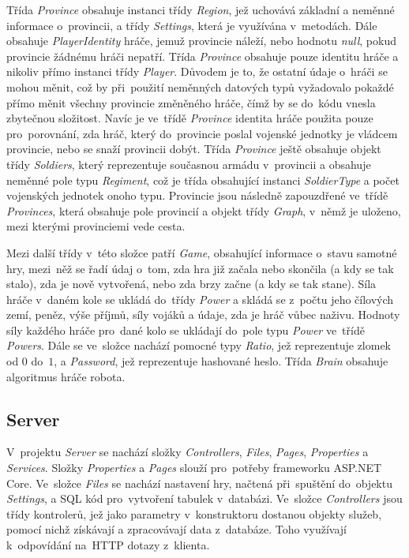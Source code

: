 \documentclass[a4paper,12pt]{article}
\begin{document}
Třída \textit{Province} obsahuje instanci třídy \textit{Region}, jež uchovává základní a neměnné informace o~provincii, a třídy \textit{Settings}, která je využívána v~metodách. Dále obsahuje \textit{PlayerIdentity} hráče, jemuž provincie náleží, nebo hodnotu \textit{null}, pokud provincie žádnému hráči nepatří. Třída \textit{Province} obsahuje pouze identitu hráče a nikoliv přímo instanci třídy \textit{Player}. Důvodem je to, že ostatní údaje o~hráči se mohou měnit, což by při~použití neměnných datových typů vyžadovalo pokaždé přímo měnit všechny provincie změněného hráče, čímž by se do~kódu vnesla zbytečnou složitost. Navíc je ve~třídě \textit{Province} identita hráče použita pouze pro~porovnání, zda hráč, který do~provincie poslal vojenské jednotky je vládcem provincie, nebo se snaží provincii dobýt. Třída \textit{Province} ještě obsahuje objekt třídy \textit{Soldiers}, který reprezentuje současnou armádu v~provincii a obsahuje neměnné pole typu \textit{Regiment}, což je třída obsahující instanci \textit{SoldierType} a počet vojenských jednotek onoho typu. Provincie jsou následně zapouzdřené ve~třídě \textit{Provinces}, která obsahuje pole provincií a objekt třídy \textit{Graph}, v~němž je uloženo, mezi kterými provinciemi vede cesta.

Mezi další třídy v~této složce patří \textit{Game}, obsahující informace o~stavu samotné hry, mezi~něž se řadí údaj o~tom, zda hra již začala nebo skončila (a kdy se tak stalo), zda je nově vytvořená, nebo zda brzy začne (a kdy se tak stane). Síla hráče v~daném kole se ukládá do~třídy \textit{Power} a skládá se z~počtu jeho čílových zemí, peněz, výše příjmů, síly vojáků a údaje, zda je hráč vůbec naživu. Hodnoty síly každého hráče pro~dané kolo se ukládají do~pole typu \textit{Power} ve~třídě \textit{Powers}. Dále se ve~složce nachází pomocné typy \textit{Ratio}, jež reprezentuje zlomek od $0$ do~$1$, a \textit{Password}, jež reprezentuje hashované heslo. Třída \textit{Brain} obsahuje algoritmus hráče robota.

\subsection{Server}
V~projektu \textit{Server} se nachází složky \textit{Controllers}, \textit{Files}, \textit{Pages}, \textit{Properties} a \textit{Services}. Složky \textit{Properties} a \textit{Pages} slouží pro~potřeby frameworku ASP.NET Core. Ve~složce \textit{Files} se nachází nastavení hry, načtená při~spuštění do~objektu \textit{Settings}, a SQL kód pro~vytvoření tabulek v~databázi. Ve~složce \textit{Controllers} jsou třídy kontrolerů, jež jako parametry v~konstruktoru dostanou objekty služeb, pomocí nichž získávají a zpracovávají data z~databáze. Toho využívají k~odpovídání na~HTTP dotazy z~klienta.
\end{document}
